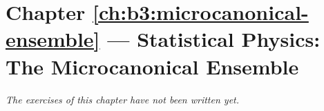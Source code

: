 \section*{Chapter \ref{ch:b3:microcanonical-ensemble} --- Statistical Physics: The Microcanonical Ensemble}


\emph{The exercises of this chapter have not been written yet.}

